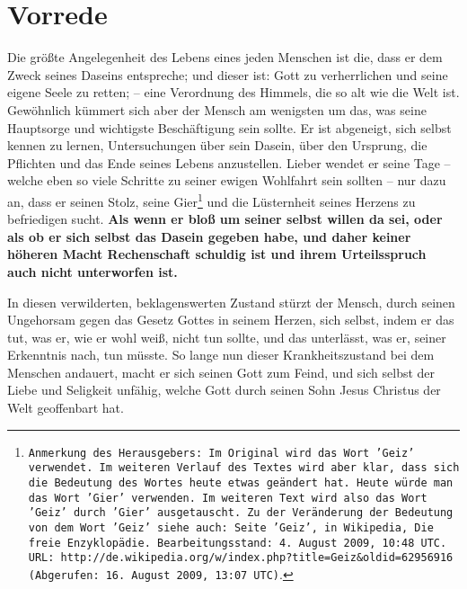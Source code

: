 \chapter{Vorrede}

Die größte Angelegenheit des Lebens eines jeden Menschen ist die, dass er dem
Zweck seines Daseins entspreche; und dieser ist: Gott zu verherrlichen und seine
eigene Seele zu retten; -- eine Verordnung des Himmels, die so alt wie die
Welt ist. Gewöhnlich kümmert sich aber der Mensch am wenigsten um das, was seine
Hauptsorge und wichtigste Beschäftigung sein sollte. Er ist abgeneigt, sich
selbst kennen zu lernen, Untersuchungen über sein Dasein, über den Ursprung, die
Pflichten und das Ende seines Lebens anzustellen. Lieber wendet er seine Tage
-- welche eben so viele Schritte zu seiner ewigen Wohlfahrt sein sollten -- nur
dazu an, dass er seinen Stolz, seine Gier\footnote{\texttt{Anmerkung des
Herausgebers:
Im Original wird das Wort 'Geiz' verwendet. Im weiteren Verlauf des
Textes wird aber klar, dass sich die Bedeutung des Wortes heute etwas geändert
hat. Heute würde man das Wort 'Gier' verwenden. Im weiteren Text wird also das
Wort 'Geiz' durch 'Gier' ausgetauscht. Zu der Veränderung der Bedeutung von
dem Wort 'Geiz' siehe auch: Seite 'Geiz', in Wikipedia, Die freie
Enzyklopädie. Bearbeitungsstand: 4. August 2009, 10:48 UTC. URL:
http://de.wikipedia.org/w/index.php?title=Geiz\&oldid=62956916 (Abgerufen: 16.
August 2009, 13:07 UTC)}.} und die Lüsternheit seines Herzens zu befriedigen
sucht.
\label{ref:vorw_sinndes_lebens}
\textbf{Als wenn er bloß um seiner selbst willen da sei, oder als ob er
sich selbst das Dasein gegeben habe, und daher keiner höheren Macht Rechenschaft
schuldig ist und ihrem Urteilsspruch auch nicht unterworfen ist.}

\medskip

In diesen verwilderten, beklagenswerten Zustand stürzt der Mensch, durch seinen
Ungehorsam gegen das Gesetz Gottes in seinem Herzen, sich selbst, indem er das
tut, was er, wie er wohl weiß, nicht tun sollte, und das unterlässt, was er,
seiner Erkenntnis nach, tun müsste. So lange nun dieser Krankheitszustand bei
dem Menschen andauert, macht er sich seinen Gott zum Feind, und sich selbst der
Liebe und Seligkeit unfähig, welche Gott durch seinen Sohn Jesus Christus der
Welt geoffenbart hat.

\medskip


